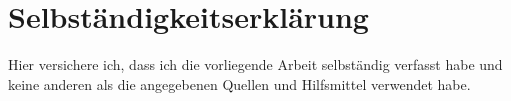 \chapter*{Selbst\"andigkeitserkl\"arung}

Hier versichere ich, dass ich die vorliegende Arbeit selbständig verfasst habe und keine anderen als die angegebenen Quellen und Hilfsmittel verwendet habe.
